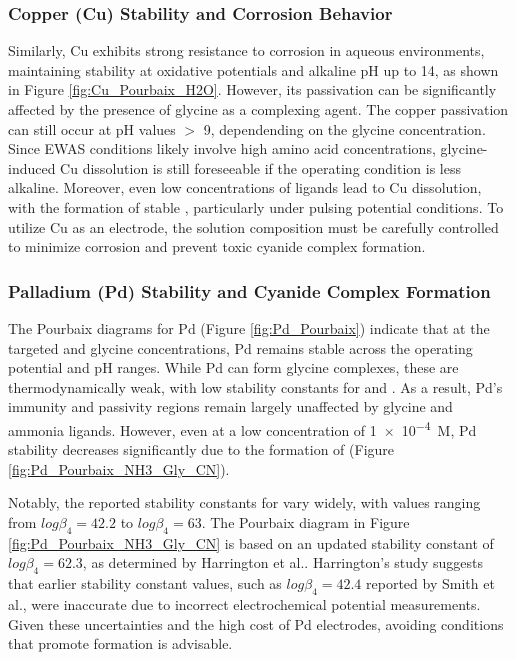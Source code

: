 \subsubsection{Copper (Cu) Stability and Corrosion Behavior}
Similarly, Cu exhibits strong resistance to corrosion in aqueous environments, maintaining stability at oxidative potentials and alkaline pH up to 14, as shown in Figure \ref{fig:Cu_Pourbaix_H2O}. However, its passivation can be significantly affected by the presence of glycine as a complexing agent\cite{Wang2022ThermodynamicDiagrams,Tripathi2009FundamentalConstituents,Skrypnikova2008PeculiaritiesAdditives,OConnor2018ElectrochemicalSolutions}. The copper passivation can still occur at pH values $>$ 9, dependending on the glycine concentration. Since EWAS conditions likely involve high amino acid concentrations, glycine-induced Cu dissolution is still foreseeable if the operating condition is less alkaline. Moreover, even low concentrations of  ligands lead to Cu dissolution, with the formation of stable , particularly under pulsing potential conditions. To utilize Cu as an electrode, the solution composition must be carefully controlled to minimize corrosion and prevent toxic cyanide complex formation.

\subsubsection{Palladium (Pd) Stability and Cyanide Complex Formation} 
The Pourbaix diagrams for Pd (Figure \ref{fig:Pd_Pourbaix}) indicate that at the targeted  and glycine concentrations, Pd remains stable across the operating potential and pH ranges. While Pd can form glycine complexes, these are thermodynamically weak, with low stability constants for \ce{[Pd(Gly)^+]} and \ce{[Pd(Gly)2]}. As a result, Pd’s immunity and passivity regions remain largely unaffected by glycine and ammonia ligands. However, even at a low  concentration of \num{1e-4}~M, Pd stability decreases significantly due to the formation of \ce{[Pd(CN)4^2+]} (Figure \ref{fig:Pd_Pourbaix_NH3_Gly_CN}).

Notably, the reported stability constants for \ce{[Pd(CN)4^2+]} vary widely, with values ranging from $log\beta_4 = 42.2$\cite{Smith1989CriticalConstants} to $log\beta_4 = 63$\cite{Cabbiness1969MacrocyclicComplexes}. The Pourbaix diagram in Figure \ref{fig:Pd_Pourbaix_NH3_Gly_CN} is based on an updated stability constant of $log\beta_4 = 62.3$, as determined by Harrington et al.\cite{Harrington2005DeterminationIon}. Harrington’s study suggests that earlier stability constant values, such as $log\beta_4 = 42.4$ reported by Smith et al.\cite{Smith1989CriticalConstants}, were inaccurate due to incorrect electrochemical potential measurements. Given these uncertainties and the high cost of Pd electrodes, avoiding conditions that promote \ce{[Pd(CN)4^2+]} formation is advisable.

